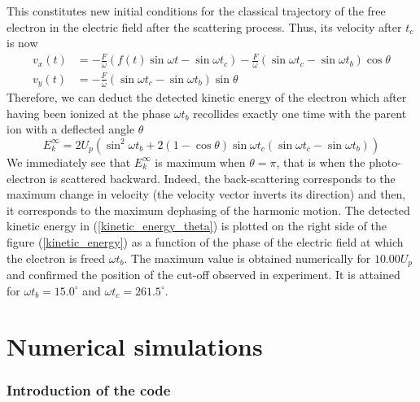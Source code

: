 \documentclass[a4paper]{article}
\begin{document}
This constitutes new initial conditions for the classical trajectory of the free electron in the electric field after the scattering process. Thus, its velocity after $t_{c}$ is now
\begin{align}
v_{x}(t)&=-\frac{F}{\omega} \left(f(t)\sin{\omega t}-\sin{\omega t_{c}} \right) - \frac{F}{\omega} \left( \sin{\omega t_{c}}-\sin{\omega t_{b}} \right) \cos{\theta} \\
v_{y}(t)&=-\frac{F}{\omega} \left( \sin{\omega t_{c}} - \sin{\omega t_{b}} \right) \sin{\theta}
\end{align}
Therefore, we can deduct the detected kinetic energy of the electron which after having been ionized at the phase $\omega t_{b}$ recollides exactly one time with the parent ion with a deflected angle $\theta$
\begin{equation}
E_{k}^{\infty}=2 U_{p} \left(\sin^{2}{\omega t_{b}}+2(1-\cos{\theta})\sin{\omega t_{c}} \left(\sin{\omega t_{c}}-\sin{\omega t_{b}}\right)\right)
\label{kinetic_energy_theta}
\end{equation}
We immediately see that $E_{k}^{\infty}$ is maximum when $\theta=\pi$, that is when the photo-electron is scattered backward. Indeed, the back-scattering corresponds to the maximum change in velocity (the velocity vector inverts its direction) and then, it corresponds to the maximum dephasing of the harmonic motion. The detected kinetic energy in (\ref{kinetic_energy_theta}) is plotted on the right side of the figure (\ref{kinetic_energy}) as a function of the phase of the electric field at which the electron is freed $\omega t_{b}$.
The maximum value is obtained numerically for $10.00 U_{p}$ and confirmed the position of the cut-off observed in experiment. It is attained for $\omega t_{b}=15.0^{\circ}$ and $\omega t_{c}=261.5^{\circ}$.

\section{Numerical simulations}
\subsubsection{Introduction of the code}
\end{document}
